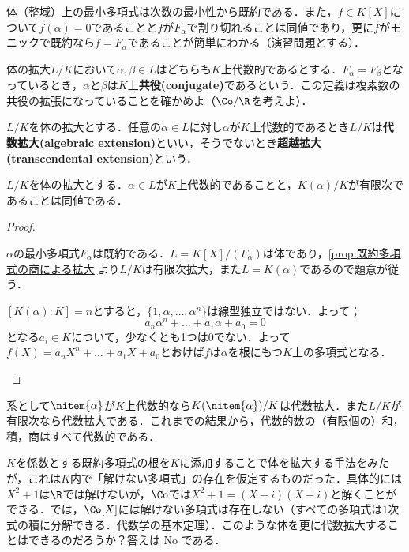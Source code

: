 体（整域）上の最小多項式は次数の最小性から既約である．また，$f\in K[X]$について$f(\alpha)=0$であることと$f$が$F_\alpha$で割り切れることは同値であり，更に$f$がモニックで既約なら$f=F_\alpha$であることが簡単にわかる（演習問題とする）．

体の拡大$L/K$において$\alpha,\beta\in L$はどちらも$K$上代数的であるとする．$F_\alpha=F_\beta$となっているとき，$\alpha$と$\beta$は$K$上\textbf{共役(conjugate)}であるという．この定義は複素数の共役の拡張になっていることを確かめよ（$\Co/\R$を考えよ）．


\begin{defi}
	$L/K$を体の拡大とする．任意の$\alpha\in L$に対し$\alpha$が$K$上代数的であるとき$L/K$は\textbf{代数拡大(algebraic extension)}といい，そうでないとき\textbf{超越拡大(transcendental extension)}という．
\end{defi}

\begin{prop}
	$L/K$を体の拡大とする．$\alpha\in L$が$K$上代数的であることと，$K(\alpha)/K$が有限次であることは同値である．
\end{prop}

\begin{proof}
	\begin{eqv}
		\item $\alpha$の最小多項式$F_\alpha$は既約である．$L=K[X]/(F_\alpha)$は体であり，\ref{prop:既約多項式の商による拡大}より$L/K$は有限次拡大，また$L=K(\alpha)$であるので題意が従う．
		
		\item $[K(\alpha):K]=n$とすると，$\{1,\alpha,\dots,\alpha^n\}$は線型独立ではない．よって；
		\[a_n\alpha^n+\dots+a_1\alpha+a_0=0\]
		となる$a_i\in K$について，少なくとも1つは0でない．よって$f(X)=a_nX^n+\dots+a_1X+a_0$とおけば$f$は$\alpha$を根にもつ$K$上の多項式となる．
	\end{eqv}
\end{proof}

系として$\nitem{\alpha}$が$K$上代数的なら$K(\nitem{\alpha})/K$は代数拡大．また$L/K$が有限次なら代数拡大である．これまでの結果から，代数的数の（有限個の）和，積，商はすべて代数的である．

$K$を係数とする既約多項式の根を$K$に添加することで体を拡大する手法をみたが，これは$K$内で「解けない多項式」の存在を仮定するものだった．具体的には$X^2+1$は$\R$では解けないが，$\Co$では$X^2+1=(X-i)(X+i)$と解くことができる．では，$\Co[X]$には解けない多項式は存在しない（すべての多項式は$1$次式の積に分解できる．代数学の基本定理）．このような体を更に代数拡大することはできるのだろうか？答えは No である．

